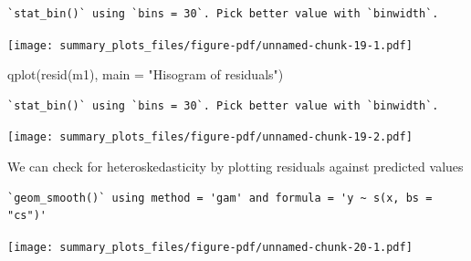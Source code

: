 \documentclass[
  letterpaper,
  DIV=11,
  numbers=noendperiod]{scrreprt}
\newenvironment{Shaded}{}{}
\newcommand{\AttributeTok}[1]{\textcolor[rgb]{0.49,0.56,0.16}{#1}}
\newcommand{\FloatTok}[1]{\textcolor[rgb]{0.25,0.63,0.44}{#1}}
\newcommand{\FunctionTok}[1]{\textcolor[rgb]{0.02,0.16,0.49}{#1}}
\newcommand{\NormalTok}[1]{#1}
\newcommand{\OtherTok}[1]{\textcolor[rgb]{0.00,0.44,0.13}{#1}}
\newcommand{\SpecialCharTok}[1]{\textcolor[rgb]{0.25,0.44,0.63}{#1}}
\newcommand{\StringTok}[1]{\textcolor[rgb]{0.25,0.44,0.63}{#1}}
\begin{document}
\begin{verbatim}
`stat_bin()` using `bins = 30`. Pick better value with `binwidth`.
\end{verbatim}

\texttt{[image: summary\_plots\_files/figure-pdf/unnamed-chunk-19-1.pdf]}

\begin{Shaded}
\begin{Highlighting}[]
  \FunctionTok{qplot}\NormalTok{(}\FunctionTok{resid}\NormalTok{(m1), }
       \AttributeTok{main =} \StringTok{"Hisogram of residuals"}\NormalTok{)}
\end{Highlighting}
\end{Shaded}

\begin{verbatim}
`stat_bin()` using `bins = 30`. Pick better value with `binwidth`.
\end{verbatim}

\texttt{[image: summary\_plots\_files/figure-pdf/unnamed-chunk-19-2.pdf]}

We can check for heteroskedasticity by plotting residuals against
predicted values

\begin{Shaded}
\end{Shaded}

\begin{verbatim}
`geom_smooth()` using method = 'gam' and formula = 'y ~ s(x, bs = "cs")'
\end{verbatim}

\texttt{[image: summary\_plots\_files/figure-pdf/unnamed-chunk-20-1.pdf]}
\end{document}
